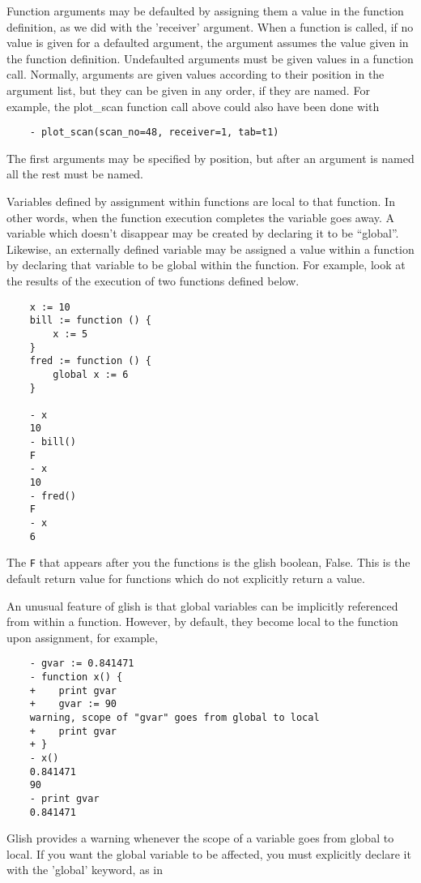     Function arguments may be defaulted by assigning them a value in the
function definition, as we did with the 'receiver' argument.  When a
function is called, if no value is given for a defaulted argument, the
argument assumes the value given in the function definition.  Undefaulted
arguments must be given values in a function call.  Normally, arguments are
given values according to their position in the argument list, but they can
be given in any order, if they are named.  For example, the plot\_scan
function call above could also have been done with

\begin{verbatim}
	- plot_scan(scan_no=48, receiver=1, tab=t1)
\end{verbatim}

The first arguments may be specified by position, but after an argument is
named all the rest must be named.

    Variables defined by assignment within functions are local to that
function.  In other words, when the function execution completes the
variable goes away.  A variable which doesn't disappear may be created by
declaring it to be ``global''.  Likewise, an externally defined variable may
be assigned a value within a function by declaring that variable to be
global within the function.  For example, look at the results of the
execution of two functions defined below.

\begin{verbatim}
	x := 10
	bill := function () {
	    x := 5
	}
	fred := function () {
	    global x := 6
	}

	- x
	10
	- bill()
	F
	- x
	10
	- fred()
	F
	- x
	6
\end{verbatim}

The \verb!F! that appears after you the functions is the glish
boolean, False.  This is the default return value for functions
which do not explicitly return a value.
 
An unusual feature of glish is that global variables can be implicitly
referenced from within a function. However, by default, they become local
to the function upon assignment, for example,

\begin{verbatim}
	- gvar := 0.841471
	- function x() {
	+    print gvar
	+    gvar := 90
	warning, scope of "gvar" goes from global to local
	+    print gvar
	+ }
	- x()   
	0.841471
	90
	- print gvar
	0.841471
\end{verbatim}

Glish provides a warning whenever the scope of a variable goes from global
to local.  If you want the global variable to be affected, you must
explicitly declare it with the 'global' keyword, as in

